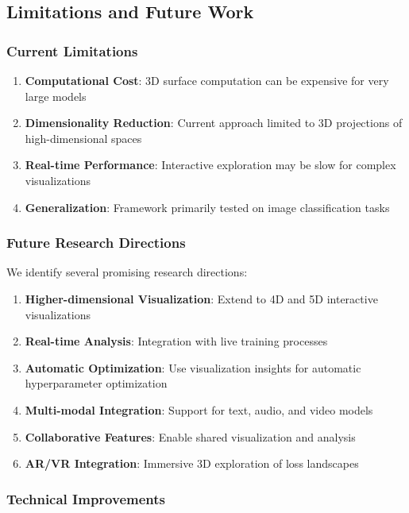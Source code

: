 \documentclass[12pt,a4paper]{article}
\begin{document}
\subsection{Limitations and Future Work}

\subsubsection{Current Limitations}

\begin{enumerate}
    \item \textbf{Computational Cost}: 3D surface computation can be expensive for very large models
    \item \textbf{Dimensionality Reduction}: Current approach limited to 3D projections of high-dimensional spaces
    \item \textbf{Real-time Performance}: Interactive exploration may be slow for complex visualizations
    \item \textbf{Generalization}: Framework primarily tested on image classification tasks
\end{enumerate}

\subsubsection{Future Research Directions}

We identify several promising research directions:

\begin{enumerate}
    \item \textbf{Higher-dimensional Visualization}: Extend to 4D and 5D interactive visualizations
    \item \textbf{Real-time Analysis}: Integration with live training processes
    \item \textbf{Automatic Optimization}: Use visualization insights for automatic hyperparameter optimization
    \item \textbf{Multi-modal Integration}: Support for text, audio, and video models
    \item \textbf{Collaborative Features}: Enable shared visualization and analysis
    \item \textbf{AR/VR Integration}: Immersive 3D exploration of loss landscapes
\end{enumerate}

\subsubsection{Technical Improvements}
\end{document}
